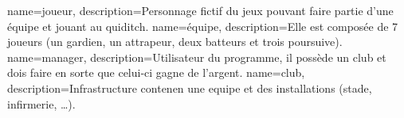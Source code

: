 {
    name=joueur,
    description={Personnage fictif du jeux pouvant faire partie d'une équipe et jouant au quiditch.}
}
{
    name=équipe,
    description={Elle est composée de 7 \glspl{joueur} (un gardien, un attrapeur, deux batteurs et trois poursuive).}
}
{
    name=manager,
    description={Utilisateur du programme, il possède un \gls{club} et dois faire en sorte que celui-ci gagne de l'argent.}
}
{
    name=club,
    description={Infrastructure contenen une \gls{equipe} et des installations (stade, infirmerie, \ldots).}
}

